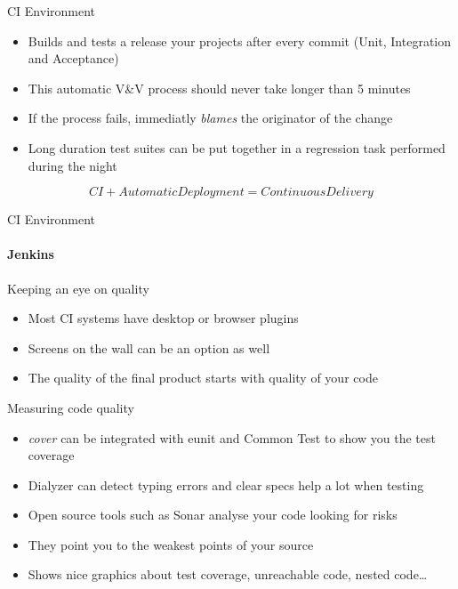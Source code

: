 \documentclass[aspectratio=169]{beamer}
\begin{document}
\begin{frame}{CI Environment}
    \begin{itemize}
    \pause
    \item Builds and tests a release your projects after every commit (Unit, Integration and Acceptance)
    \pause
    \item This automatic V\&V process should never take longer than 5 minutes
    \pause
    \item If the process fails, immediatly \emph{blames} the originator of the change
    \pause
    \item Long duration test suites can be put together in a regression task performed during the night
    \end{itemize}
    \pause
    \begin{equation*}
    \boxed{CI + AutomaticDeployment = ContinuousDelivery}
    \end{equation*}
\end{frame}
\begin{frame}{CI Environment}
    \framesubtitle{Jenkins}
\end{frame}

\begin{frame}{Keeping an eye on quality}
    \begin{itemize}
    \item Most CI systems have desktop or browser plugins
    \item Screens on the wall can be an option as well
    \item The quality of the final product starts with quality of your code
    \end{itemize}
\end{frame}

\begin{frame}{Measuring code quality}
    \begin{itemize}
    \pause
    \item \emph{cover} can be integrated with eunit and Common Test to show you the test coverage
    \pause
    \item Dialyzer can detect typing errors and clear specs help a lot when testing
    \pause
    \item Open source tools such as Sonar analyse your code looking for risks
    \pause
    \item They point you to the weakest points of your source
    \pause
    \item Shows nice graphics about test coverage, unreachable code, nested code\dots
    \end{itemize}
\end{frame}
\end{document}

